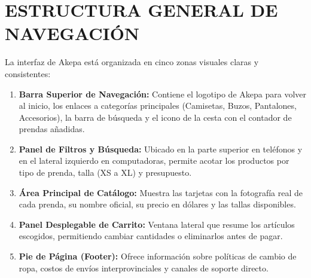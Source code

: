 \documentclass[12pt]{article}
\begin{document}
\section*{ESTRUCTURA GENERAL DE NAVEGACIÓN}
La interfaz de Akepa está organizada en cinco zonas visuales claras y consistentes:
\begin{enumerate}
    \item \textbf{Barra Superior de Navegación:} Contiene el logotipo de Akepa para volver al inicio, los enlaces a categorías principales (Camisetas, Buzos, Pantalones, Accesorios), la barra de búsqueda y el icono de la cesta con el contador de prendas añadidas.
    \item \textbf{Panel de Filtros y Búsqueda:} Ubicado en la parte superior en teléfonos y en el lateral izquierdo en computadoras, permite acotar los productos por tipo de prenda, talla (XS a XL) y presupuesto.
    \item \textbf{Área Principal de Catálogo:} Muestra las tarjetas con la fotografía real de cada prenda, su nombre oficial, su precio en dólares y las tallas disponibles.
    \item \textbf{Panel Desplegable de Carrito:} Ventana lateral que resume los artículos escogidos, permitiendo cambiar cantidades o eliminarlos antes de pagar.
    \item \textbf{Pie de Página (Footer):} Ofrece información sobre políticas de cambio de ropa, costos de envíos interprovinciales y canales de soporte directo.
\end{enumerate}
\end{document}
